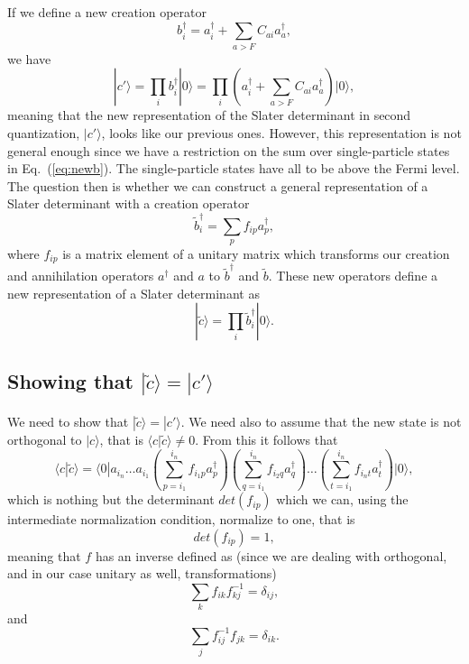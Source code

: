 \documentclass[%
twoside,                 %
final,                   %
10pt]{article}
\begin{document}
If we define a new creation operator 
\begin{equation}
b^{\dagger}_{i}=a^{\dagger}_{i}+\sum_{a>F}C_{ai}a_{a}^{\dagger}, \label{eq:newb}
\end{equation}
we have 
\[
|c'\rangle=\prod_{i}b^{\dagger}_{i}|0\rangle=\prod_{i}\left(a^{\dagger}_{i}+\sum_{a>F}C_{ai}a_{a}^{\dagger}\right)|0\rangle,
\]
meaning that the new representation of the Slater determinant in second quantization, $|c'\rangle$, looks like our previous ones. However, this representation is not general enough since we have a restriction on the sum over single-particle states in Eq.~(\ref{eq:newb}). The single-particle states have all to be above the Fermi level.
The question then is whether we can construct a general representation of a Slater determinant with a creation operator 
\[
\tilde{b}^{\dagger}_{i}=\sum_{p}f_{ip}a_{p}^{\dagger},
\]
where $f_{ip}$ is a matrix element of a unitary matrix which transforms our creation and annihilation operators
$a^{\dagger}$ and $a$ to $\tilde{b}^{\dagger}$ and $\tilde{b}$. These new operators define a new representation of a Slater determinant as
\[
|\tilde{c}\rangle=\prod_{i}\tilde{b}^{\dagger}_{i}|0\rangle.
\]



\subsection*{Showing that $|\tilde{c}\rangle= |c'\rangle$}

\paragraph{}


We need to show that $|\tilde{c}\rangle= |c'\rangle$. We need also to assume that the new state
is not orthogonal to $|c\rangle$, that is $\langle c| \tilde{c}\rangle \ne 0$. From this it follows that 
\[
\langle c| \tilde{c}\rangle=\langle 0| a_{i_n}\dots a_{i_1}\left(\sum_{p=i_1}^{i_n}f_{i_1p}a_{p}^{\dagger} \right)\left(\sum_{q=i_1}^{i_n}f_{i_2q}a_{q}^{\dagger} \right)\dots \left(\sum_{t=i_1}^{i_n}f_{i_nt}a_{t}^{\dagger} \right)|0\rangle,
\]
which is nothing but the determinant $det(f_{ip})$ which we can, using the intermediate normalization condition, 
normalize to one, that is
\[
det(f_{ip})=1,
\]
meaning that $f$ has an inverse defined as (since we are dealing with orthogonal, and in our case unitary as well, transformations)
\[
\sum_{k} f_{ik}f^{-1}_{kj} = \delta_{ij},
\]
and 
\[
\sum_{j} f^{-1}_{ij}f_{jk} = \delta_{ik}.
\]
\end{document}
